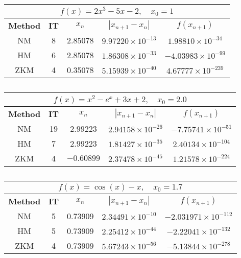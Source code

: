 \begin{table}[H]
		\caption{}
		\centering
		\begin{english}
	\begin{tabular}{|c|c|c|c|c|}
		\hline
		\multicolumn{5}{|c|}{$f(x) = 2x^3 - 5x - 2, \quad x_0 = 1$}\\
		\hline
		\textbf{Method} & \textbf{IT} & $x_n$ & $|x_{n+1}-x_n|$& $f(x_{n+1})$ \\
		\hline
		NM & 8 & 2.85078 & $9.97220\times 10^{-13}$ & $1.98810\times 10^{-34}$\\
		HM & 6 & 2.85078 & $1.86308\times 10^{-33}$ & $-4.03983\times 10^{-99}$\\
		ZKM & 4 & 0.35078 & $5.15939\times10^{-40}$ & $4.67777 \times10^{-239}$\\
		\hline
	\end{tabular}
\end{english}
\end{table}
\vspace{1cm}
\begin{table}[H]
	\caption{}
		\renewcommand{\arraystretch}{2}
	\centering
	\begin{english}
		\begin{tabular}{|c|c|c|c|c|}
			\hline
			\multicolumn{5}{|c|}{$f(x) = x^2 - e^x + 3x +2, \quad x_0 = 2.0$}\\
			\hline
			\textbf{Method} & \textbf{IT} & $x_n$ & $|x_{n+1}-x_n|$& $f(x_{n+1})$ \\
			\hline
			NM & 19 & 2.99223 & $2.94158\times 10^{-26}$ & $-7.75741\times 10^{-51}$\\
			HM & 7 & 2.99223 & $1.81427\times 10^{-35}$ & $2.40134\times 10^{-104}$\\
			ZKM & 4 & $-0.60899$ & $2.37478\times10^{-45}$ & $1.21578\times10^{-224}$\\
			\hline
		\end{tabular}
	\end{english}
\end{table}
\newpage
\begin{table}[H]
	\caption{}
		\renewcommand{\arraystretch}{2}
	\centering
	\begin{english}
		\begin{tabular}{|c|c|c|c|c|}
			\hline
			\multicolumn{5}{|c|}{$f(x) = \cos(x) - x, \quad x_0 = 1.7$}\\
			\hline
			\textbf{Method} & \textbf{IT} & $x_n$ & $|x_{n+1}-x_n|$& $f(x_{n+1})$ \\
			\hline
			NM & 5 & 0.73909 & $2.34491\times 10^{-10}$ & $-2.031971\times 10^{-112}$\\
			HM & 5 & 0.73909 & $2.25412\times 10^{-44}$ & $-2.22041\times 10^{-132}$\\
			ZKM & 4 & 0.73909 & $5.67243\times10^{-56}$ & $-5.13844 \times10^{-278}$\\
			\hline
		\end{tabular}
	\end{english}
\end{table}
